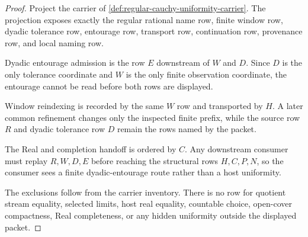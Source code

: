 \begin{proof}
Project the carrier of \autoref{def:regular-cauchy-uniformity-carrier}. The projection exposes exactly the regular rational name row, finite window row, dyadic tolerance row, entourage row, transport row, continuation row, provenance row, and local naming row.

Dyadic entourage admission is the row $E$ downstream of $W$ and $D$. Since $D$ is the only tolerance coordinate and $W$ is the only finite observation coordinate, the entourage cannot be read before both rows are displayed.

Window reindexing is recorded by the same $W$ row and transported by $H$. A later common refinement changes only the inspected finite prefix, while the source row $R$ and dyadic tolerance row $D$ remain the rows named by the packet.

The Real and completion handoff is ordered by $C$. Any downstream consumer must replay $R,W,D,E$ before reaching the structural rows $H,C,P,N$, so the consumer sees a finite dyadic-entourage route rather than a host uniformity.

The exclusions follow from the carrier inventory. There is no row for quotient stream equality, selected limits, host real equality, countable choice, open-cover compactness, Real completeness, or any hidden uniformity outside the displayed packet.
\end{proof}

